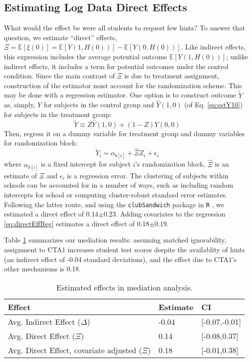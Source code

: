 \documentclass{article}\usepackage[]{graphicx}\usepackage[]{color}
\newcommand{\EE}{\mathbb{E}}
\begin{document}
\subsection{Estimating Log Data Direct Effects}\label{sec:directEst}

What would the effect be were all students to request few hints?
To answer that question, we estimate ``direct'' effects,
$\Xi=\EE[\xi(0)]=\EE[Y(1,H(0))]-\EE[Y(0,H(0))]$.
Like indirect effects, this expression includes the average potential
outcome $\EE[Y(1,H(0))]$; unlike indirect effects, it includes a term for
potential outcomes under the control condition.
Since the main contrast of $\Xi$ is due to treatment assignment,
construction of the estimator must account for the randomization
scheme.
This may be done with a regression estimator.
One option is to construct outcome $\tilde{Y}$ as, simply, $Y$ for
subjects in the control group and $\hat{Y}(1,0)$ (of Eq. \ref{eq:estY10}) for subjects in the
treatment group:
\begin{equation*}
\tilde{Y}\equiv Z\hat{Y}(1,0)+(1-Z)Y(0,0)
\end{equation*}
Then, regress it on a dummy variable for treatment group and dummy
variables for randomization block:
\begin{equation}\label{eq:directEffReg}
\tilde{Y}_i=\alpha_{b[i]}+\hat{\Xi}Z_i+\epsilon_i
\end{equation}
where $\alpha_{b[i]}$ is a fixed intercept for subject $i$'s randomization block, $\hat{\Xi}$ is an estimate of $\Xi$ and $\epsilon_i$ is a regression error.
The clustering of subjects within schools can be accounted for in a
number of ways, such as including random intercepts for school or
computing cluster-robust standard error estimates.
Following the latter route, and using the \texttt{clubSandwich}
package in \texttt{R} \citep{clubsandwich}, we estimated a direct
effect of
0.14$\pm$0.23.
Adding covariates to the regression \eqref{eq:directEffReg} estimates a direct effect of
0.18$\pm$0.19.

Table \ref{tab:mediation} summarizes our mediation results: assuming matched ignorability, assignment to CTA1 increases student test scores despite the availablity of hints (an indirect effect of -0.04 standard deviations), and the effect due to CTA1's other mechanisms is 0.18.

\begin{table}
\centering
\begin{tabular}{lll}
\hline
Effect&Estimate&CI\\
\hline
Avg. Indirect Effect ($\Delta$)& -0.04 & [-0.07,-0.01] \\
Avg. Direct Effect ($\Xi$)& 0.14 & [-0.08,0.37] \\
Avg. Direct Effect, covariate adjusted ($\Xi$) & 0.18 & [-0.01,0.38] \\

\hline
\end{tabular}
\caption{Estimated effects in mediation analysis. }
\label{tab:mediation}
\end{table}
\end{document}
